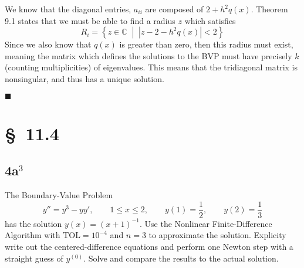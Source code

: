 \documentclass[12pt]{article}
\begin{document}
We know that the diagonal entries, $a_{ii}$ are composed of
$2+h^2q(x)$. Theorem 9.1 states that we must be able to find a radius
$z$ which satisfies
$$ R_i = \left\{ z \in \mathbb{C} \;\middle|\; |z-2-h^2q(x)| < 2\right\} $$
Since we also know that $q(x)$ is greater than zero, then this radius
must exist, meaning the matrix which defines the solutions to the BVP
must have precisely $k$ (counting multiplicities) of eigenvalues.
This means that the tridiagonal matrix is nonsingular, and thus has a
unique solution.

\hfill$ \blacksquare $

\section{\S~11.4}
\subsection{4a$^3$}
The Boundary-Value Problem
$$ y'' = y^3-yy',\qquad 1\leq x\leq2,\qquad y(1)=\frac{1}{2},\qquad y(2)=\frac{1}{3} $$
has the solution $y(x)=(x+1)^{-1}$. Use the Nonlinear
Finite-Difference Algorithm with $\text{TOL}=10^{-4}$ and $n=3$ to
approximate the solution. Explicity write out the centered-difference
equations and perform one Newton step with a straight guess of
$y^{(0)}$. Solve and compare the results to the actual solution.
\end{document}
